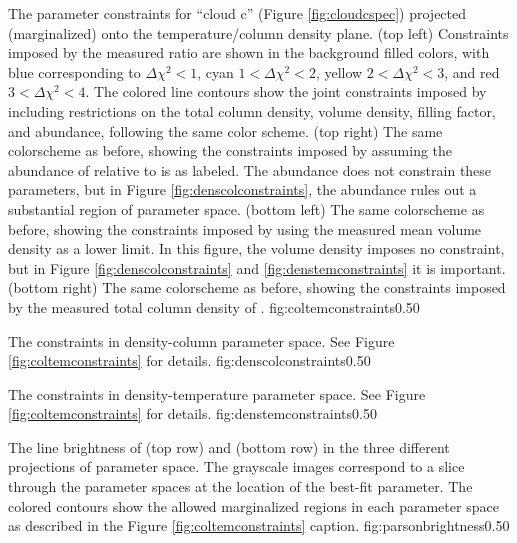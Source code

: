 {The parameter constraints for ``cloud c'' (Figure \ref{fig:cloudcspec})
projected (marginalized) onto the temperature/column density plane.\newline
(top left) Constraints imposed by the measured ratio \Rone are shown in the
background filled colors,
with blue corresponding to $\Delta\chi^2 < 1$, cyan $1 < \Delta\chi^2 < 2$,
yellow $2 < \Delta\chi^2 < 3$, and red $3 < \Delta\chi^2 < 4$.  The colored line
contours show the joint constraints imposed by including restrictions on the
total column density, volume density,  filling factor, and abundance, following
the same color
scheme.
\newline
(top right) The same colorscheme as before, showing the constraints imposed by
assuming the abundance of \para relative to \hh is as labeled.  
The abundance does not constrain these parameters, but in Figure
\ref{fig:denscolconstraints}, the abundance rules out a substantial region of parameter
space.
\newline
(bottom left) The same colorscheme as before, showing the constraints imposed
by using the measured mean volume density as a lower limit.  In this figure,
the volume density imposes no constraint, but in Figure \ref{fig:denscolconstraints}
and \ref{fig:denstemconstraints} it is important.
\newline
(bottom right) The same colorscheme as before, showing the constraints imposed
by the measured total column density of \hh.
}
{fig:coltemconstraints}{0.5}{0}

{The constraints in density-column parameter space.
See Figure \ref{fig:coltemconstraints} for details.
}
{fig:denscolconstraints}{0.5}{0}

{The constraints in density-temperature parameter space.
See Figure \ref{fig:coltemconstraints} for details.}
{fig:denstemconstraints}{0.5}{0}

{The line brightness of \para \threeohthree (top row) and \para \threetwoone
(bottom row) in the three different projections of parameter space.  The
grayscale images correspond to a slice through the parameter spaces at the
location of the best-fit parameter.  The colored contours show the allowed
marginalized regions in each parameter space as described in the
Figure \ref{fig:coltemconstraints} caption.}
{fig:parsonbrightness}{0.5}{0}

